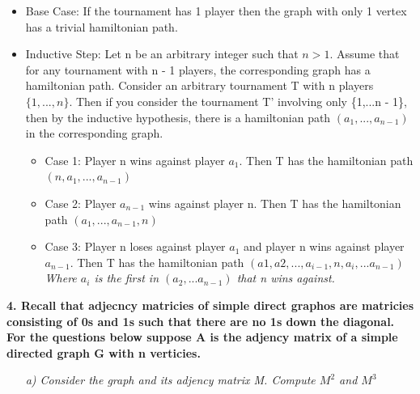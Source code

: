 \documentclass[12pt, letterpaper]{article}
\begin{document}
\begin{itemize}
\item \textnormal{ Base Case: } \newline
\textnormal{ If the tournament has 1 player then the graph with only 1 vertex has a trivial hamiltonian path. }

\item \textnormal{Inductive Step:} \newline
\textnormal{ Let n be an arbitrary integer such that \(n > 1\). Assume that for any tournament with n - 1 players, the corresponding graph has a hamiltonian path. } \newline \newline 
\textnormal{ Consider an arbitrary tournament T with n players \(\{1, ..., n\}\). Then if you consider the tournament T' involving only \{1,...n - 1\}, then by the inductive hypothesis, there is a hamiltonian path \((a_1,...,a_{n-1})\) in the corresponding graph. }

\begin{itemize}
\item \textnormal{Case 1: Player n wins against player \(a_1\). Then T has the hamiltonian path \((n, a_1,..., a_{n-1})\) }
\item \textnormal{Case 2: Player \(a_{n - 1}\) wins against player n. Then T has the hamiltonian path \((a_1,..., a_{n-1}, n)\) }
\item \textnormal{Case 3: Player n loses against player \(a_1\) and player n wins against player \(a_{n-1}\). Then T has the hamiltonian path \((a1, a2,..., a_{i - 1}, n, a_i,...a_{n-1} )\)} \newline \newline
\-\ \it{ Where \(a_i\) is the first in \((a_2,...a_{n-1})\) that n wins against.  }

\end{itemize}
\end{itemize}

\newpage
\bf{ 4. Recall that adjecncy matricies of simple direct graphos are matricies consisting of 0s and 1s such that there are no 1s down the diagonal. For the questions below suppose A is the adjency matrix of a simple directed graph G with n verticies. }

\-\ \newline
\-\ \it{ a) Consider the graph and its adjency matrix M. Compute \(M^2\) and \(M^3\) }
\end{document}
